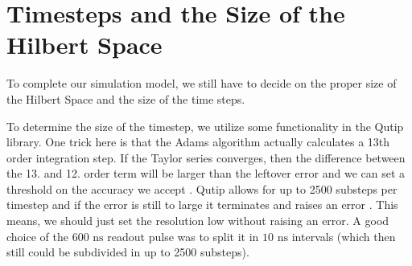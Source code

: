 








\section{Timesteps and the Size of the Hilbert Space}\label{sec:hilbert_space}
To complete our simulation model, we still have to decide on the proper size of the Hilbert Space and the size of the time steps. 

To determine the size of the timestep, we utilize some functionality in the Qutip library. One trick here is that the Adams algorithm actually calculates a 13th order integration step. If the Taylor series converges, then the difference between the 13. and 12. order term will be larger than the leftover error and we can set a threshold on the accuracy we accept \cite{lindstrom_kalkulus_2016}. Qutip allows for up to 2500 substeps per timestep and if the error is still to large it terminates and raises an error \cite{johansson_qutip_2012}. This means, we should just set the resolution low without raising an error. A good choice of the $600 \text{ ns}$ readout pulse was to split it in $10 \text{ ns}$ intervals (which then still could be subdivided in up to 2500 substeps). %

